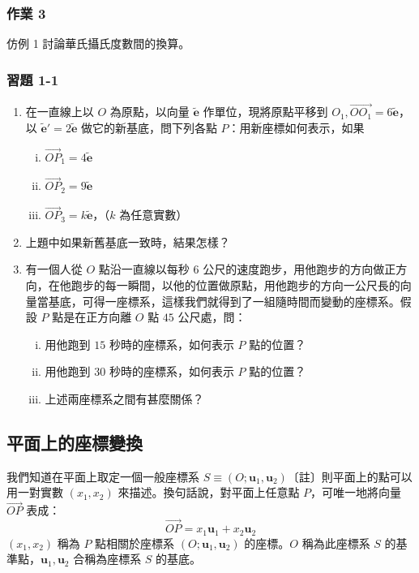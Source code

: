\subsubsection*{作業 3}
仿例 1 討論華氏攝氏度數間的換算。

\subsubsection*{習題 1-1}
\begin{enumerate}
  \item 在一直線上以 $O$ 為原點，以向量 $\tilde{\mathbf{e}}$ 作單位，現將原點平移到 $O_1, \vec{OO_1} = 6\tilde{\mathbf{e}}$，以 $\tilde{\mathbf{e}}' = 2\tilde{\mathbf{e}}$ 做它的新基底，問下列各點 $P$：用新座標如何表示，如果
  \begin{enumerate}[(i)]
    \item $\vec{OP}_1 = 4\tilde{\mathbf{e}}$
    \item $\vec{OP}_2 = 9\tilde{\mathbf{e}}$
    \item $\vec{OP}_3 = k\tilde{\mathbf{e}}$，（$k$ 為任意實數）
  \end{enumerate}
  \item 上題中如果新舊基底一致時，結果怎樣？
  \item 有一個人從 $O$ 點沿一直線以每秒 $6$ 公尺的速度跑步，用他跑步的方向做正方向，在他跑步的每一瞬間，以他的位置做原點，用他跑步的方向一公尺長的向量當基底，可得一座標系，這樣我們就得到了一組隨時間而變動的座標系。假設 $P$ 點是在正方向離 $O$ 點 $45$ 公尺處，問：
  \begin{enumerate}[(i)]
    \item 用他跑到 $15$ 秒時的座標系，如何表示 $P$ 點的位置？
    \item 用他跑到 $30$ 秒時的座標系，如何表示 $P$ 點的位置？
    \item 上述兩座標系之間有甚麼關係？
  \end{enumerate}
\end{enumerate}
\subsection{平面上的座標變換}
\label{sec:b4s-1-2}

我們知道在平面上取定一個一般座標系 $S \equiv (O; \mathbf{u}_1, \mathbf{u}_2)$〔註〕則平面上的點可以用一對實數 $(x_1, x_2)$ 來描述。換句話說，對平面上任意點 $P$，可唯一地將向量 $\vec{OP}$ 表成：
\[ \vec{OP} = x_1 \mathbf{u}_1 + x_2 \mathbf{u}_2 \]
$(x_1, x_2)$ 稱為 $P$ 點相關於座標系 $(O; \mathbf{u}_1, \mathbf{u}_2)$ 的座標。$O$ 稱為此座標系 $S$ 的基準點，$\mathbf{u}_1, \mathbf{u}_2$ 合稱為座標系 $S$ 的基底。

